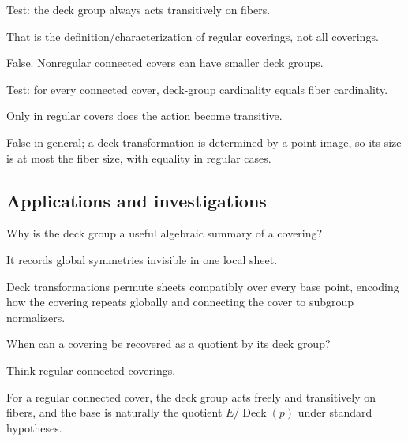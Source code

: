\begin{exercise}\label{exr:viii12-ped-11}
Test: the deck group always acts transitively on fibers.
\end{exercise}
\begin{hint}
That is the definition/characterization of regular coverings, not all coverings.
\end{hint}
\begin{solution}
False. Nonregular connected covers can have smaller deck groups.
\end{solution}

\begin{exercise}\label{exr:viii12-ped-12}
Test: for every connected cover, deck-group cardinality equals fiber cardinality.
\end{exercise}
\begin{hint}
Only in regular covers does the action become transitive.
\end{hint}
\begin{solution}
False in general; a deck transformation is determined by a point image, so its size is at most the fiber size, with equality in regular cases.
\end{solution}

\subsection*{Applications and investigations}

\begin{exercise}\label{exr:viii12-ped-13}
Why is the deck group a useful algebraic summary of a covering?
\end{exercise}
\begin{hint}
It records global symmetries invisible in one local sheet.
\end{hint}
\begin{solution}
Deck transformations permute sheets compatibly over every base point, encoding how the covering repeats globally and connecting the cover to subgroup normalizers.
\end{solution}

\begin{exercise}\label{exr:viii12-ped-14}
When can a covering be recovered as a quotient by its deck group?
\end{exercise}
\begin{hint}
Think regular connected coverings.
\end{hint}
\begin{solution}
For a regular connected cover, the deck group acts freely and transitively on fibers, and the base is naturally the quotient $E/\operatorname{Deck}(p)$ under standard hypotheses.
\end{solution}

